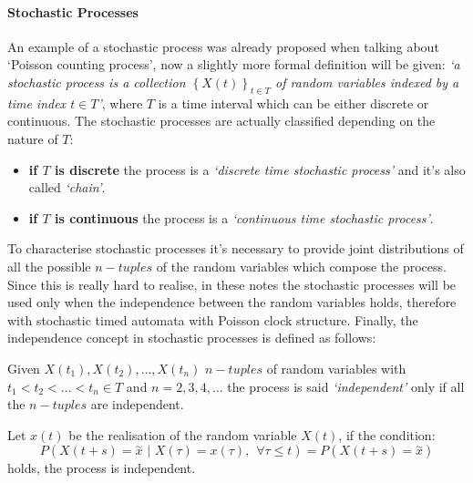\documentclass[12pt,a4paper]{article}
\begin{document}
\paragraph{Stochastic Processes}
An example of a stochastic process was already proposed when talking about `Poisson counting process', now a slightly more formal definition will be given: \emph{`a stochastic process is a collection $\left\lbrace X\left(t\right) \right\rbrace_{t\in T} $
of random variables indexed by a time index $t\in T$'}, where $T$ is a time interval which can be either discrete or continuous.
The stochastic processes are actually classified depending on the nature of $T$:
\begin{itemize}
\item \textbf{if $T$ is discrete} the process is a \emph{`discrete time stochastic process'} 
and it's also called \emph{`chain'}.
\item \textbf{if $T$ is continuous} the process is a \emph{`continuous time stochastic process'}.
\end{itemize}
To characterise stochastic processes it's necessary to provide joint distributions of all the possible $n-tuples$ of the random variables which compose the process. Since this is really hard to realise, in these notes the stochastic processes will be used
only when the independence between the random variables holds, therefore with stochastic timed automata with Poisson clock structure. Finally, the independence concept in stochastic processes is defined as follows:

\bigskip
\noindent 
Given $X(t_1), X(t_2),\dots, X(t_n)$ $n-tuples$ of random variables with $t_1<t_2<\dots<t_n \in T$ and $n=2,3,4,\dots$ the process is said \emph{`independent'} only if all the $n-tuples$ are independent. 

\bigskip
\noindent 
Let $x(t)$ be the realisation of the random variable $X(t)$, if the condition:
$$
P\left(X\left(t+s\right)=\overset{\sim}{x}\hspace{4pt}|\hspace{4pt}X\left(\tau\right)=
x\left(\tau\right),\hspace{5pt}\forall\tau\leq t\right)=
P\left(X\left(t+s\right)=\overset{\sim}{x} \right)
$$
holds, the process is independent.
\end{document}
